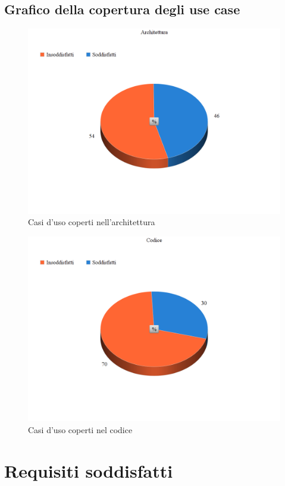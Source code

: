 \documentclass[openany,12pt,a4paper]{report}
\begin{document}
	\section{Grafico della copertura degli use case}
		\begin{figure}[H]
		\includegraphics[scale=0.35]{casi_d'uso_Architettura}
		\centering
		\caption{Casi d’uso coperti nell'architettura}
	\end{figure}
	\begin{figure}[H]
		\includegraphics[scale=0.35]{casi_d'uso_codice}
		\centering
		\caption{Casi d’uso coperti nel codice}
	\end{figure}
	\chapter{Requisiti soddisfatti}
	
\end{document}
